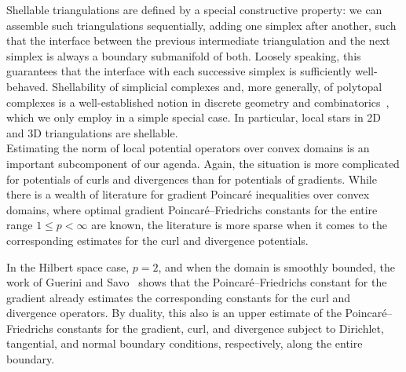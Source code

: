 \documentclass[10pt,letterpaper]{article}
\begin{document}
Shellable triangulations are defined by a special constructive property:
we can assemble such triangulations sequentially, adding one simplex after another, such that the interface between the previous intermediate triangulation and the next simplex is always a boundary submanifold of both.
Loosely speaking, this guarantees that the interface with each successive simplex is sufficiently well-behaved.
Shellability of simplicial complexes and, more generally, of polytopal complexes is a well-established notion in discrete geometry and combinatorics~\cite{ziegler2012lectures}, which we only employ in a simple special case. 
In particular, local stars in 2D and 3D triangulations are shellable. 
\\



Estimating the norm of local potential operators over convex domains is an important subcomponent of our agenda. 
Again, the situation is more complicated for potentials of curls and divergences than for potentials of gradients.
While there is a wealth of literature for gradient Poincar\'e inequalities over convex domains, where optimal gradient Poincar\'e--Friedrichs constants for the entire range $1 \leq p < \infty$ are known,
the literature is more sparse when it comes to the corresponding estimates for the curl and divergence potentials.

In the Hilbert space case, $p=2$, and when the domain is smoothly bounded, the work of Guerini and Savo~\cite{guerini2004eigenvalue} shows that the Poincar\'e--Friedrichs constant for the gradient already estimates the corresponding constants for the curl and divergence operators. By duality, this also is an upper estimate of the Poincar\'e--Friedrichs constants for the gradient, curl, and divergence subject to Dirichlet, tangential, and normal boundary conditions, respectively, along the entire boundary. 
\end{document}
